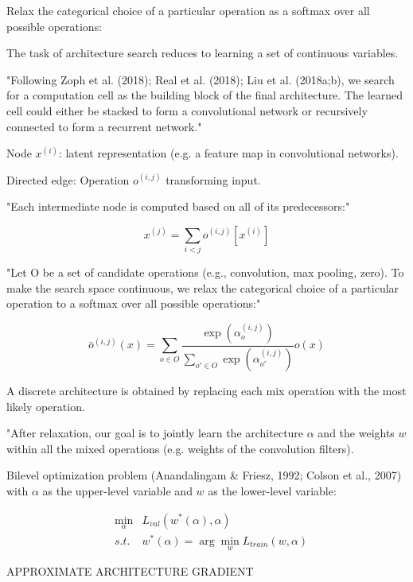 \documentclass[english]{article}
\begin{document}
Relax the categorical choice of a particular operation as a softmax over all possible operations:

\benum 
\item 
The task of architecture search reduces to learning a set of continuous variables.

"Following Zoph et al. (2018); Real et al. (2018); Liu et al. (2018a;b), we search for a computation
cell as the building block of the final architecture. The learned cell could either be stacked to form a
convolutional network or recursively connected to form a recurrent network."

Node $x^{(i)}$: latent representation (e.g. a feature map in convolutional networks).

Directed edge:  Operation $o^{(i,j)}$ transforming input.

"Each intermediate node is computed based on all of its predecessors:"

$$x^{(j)} = \sum_{i<j} o^{(i,j)}[x^{(i)}]$$


"Let O be a set of candidate operations (e.g., convolution, max pooling, zero). To make the search space continuous, we relax
the categorical choice of a particular operation to a softmax over all possible operations:"

$$\bar o^{(i,j)}(x) = \sum_{o\in O} 
\frac{\exp(\alpha_o^{(i,j)})}
{\sum_{o'\in O}\exp(\alpha_{o'}^{(i,j)})}
o(x)$$




\item 
A discrete architecture is obtained by replacing each mix operation  with the most likely operation. 


\item "After relaxation, our goal is to jointly learn the architecture $\alpha$ and the weights $w$ within all the mixed
operations (e.g. weights of the convolution filters).

\item Bilevel optimization problem (Anandalingam \& Friesz, 1992; Colson et al., 2007) with $\alpha$ as the upper-level variable and $w$ as the lower-level variable:

\begin{align*}
&\min_\alpha &L_{val}(w^*(\alpha),\alpha)\\
&s.t. & w^*(\alpha) = \arg\min_w L_{train} (w,\alpha)
\end{align*} 

\item APPROXIMATE ARCHITECTURE GRADIENT
\end{document}
